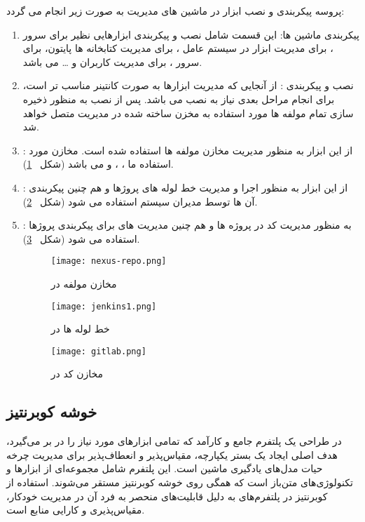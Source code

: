 پروسه پیکربندی و نصب ابزار در ماشین های مدیریت به صورت زیر انجام می گردد:
\begin{enumerate}
	\item 
	پیکربندی ماشین ها:
این قسمت شامل نصب و پیکربندی ابزارهایی نظیر
برای سرور ،
برای مدیریت ابزار در سیستم عامل ،
برای مدیریت کتابخانه ها پایتون،
برای سرور 
، 
برای مدیریت کاربران و … می باشد.
	\item
نصب و پیکربندی : از آنجایی که مدیریت ابزارها به صورت کانتینر مناسب تر است، برای انجام مراحل بعدی نیاز به نصب  می باشد. پس از نصب به منظور ذخیره سازی تمام مولفه ها مورد استفاده به مخزن ساخته شده در  مدیریت متصل خواهد شد.
	\item 
 : از این ابزار به منظور مدیریت مخازن مولفه ها استفاده شده است. مخازن مورد استفاده ما ، 
	،
	و  می باشد (شکل 
	~\ref{fig: nexus repo}).

	\item 
 : از این ابزار به منظور اجرا و مدیریت خط لوله های  پروژها و هم چنین پیکربندی آن ها توسط مدیران سیستم استفاده می شود (شکل 
	~\ref{fig: jenkins}).
	
	\item 
 : به منظور مدیریت کد در پروژه ها و هم چنین مدیریت های  برای پیکربندی پروژها استفاده می شود (شکل 
	~\ref{fig: gitlab}).
	
\begin{figure}[t]
	\centering
	\texttt{[image: nexus-repo.png]}
	\caption{مخازن مولفه در }
	\label{fig: nexus repo}
\end{figure}
\begin{figure}[t]
	\centering
	\texttt{[image: jenkins1.png]}
	\caption{خط لوله ها  در }
	\label{fig: jenkins}
\end{figure}
\begin{figure}[t]
	\centering
	\texttt{[image: gitlab.png]}
	\caption{مخازن کد در }
	\label{fig: gitlab}
\end{figure}
\end{enumerate}


\subsection{خوشه کوبرنتیز}
در طراحی یک پلتفرم  جامع و کارآمد که تمامی ابزارهای مورد نیاز را در بر می‌گیرد، هدف اصلی ایجاد یک بستر یکپارچه، مقیاس‌پذیر و انعطاف‌پذیر برای مدیریت چرخه حیات مدل‌های یادگیری ماشین است. این پلتفرم شامل مجموعه‌ای از ابزارها و تکنولوژی‌های متن‌باز است که همگی روی خوشه کوبرنتیز مستقر می‌شوند. استفاده از کوبرنتیز در پلتفرم‌های  به دلیل قابلیت‌های منحصر به فرد آن در مدیریت خودکار، مقیاس‌پذیری و کارایی منابع است. 

